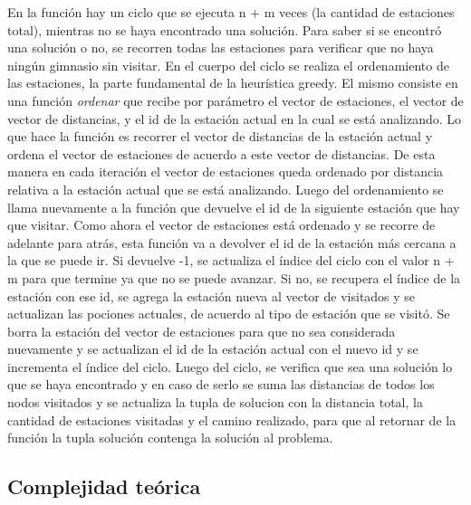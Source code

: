             En la función hay un ciclo que se ejecuta n + m veces (la cantidad de estaciones total), mientras no se haya encontrado una solución. Para saber si se encontró una solución o no, se recorren todas las estaciones para verificar que no haya ningún gimnasio sin visitar. En el cuerpo del ciclo se realiza el ordenamiento de las estaciones, la parte fundamental de la heurística greedy. El mismo consiste en una función \textit{ordenar} que recibe por parámetro el vector de estaciones, el vector de vector de distancias, y el id de la estación actual en la cual se está analizando. Lo que hace la función es recorrer el vector de distancias de la estación actual y ordena el vector de estaciones de acuerdo a este vector de distancias. De esta manera en cada iteración el vector de estaciones queda ordenado por distancia relativa a la estación actual que se está analizando. Luego del ordenamiento se llama nuevamente a la función que devuelve el id de la siguiente estación que hay que visitar. Como ahora el vector de estaciones está ordenado y se recorre de adelante para atrás, esta función va a devolver el id de la estación más cercana a la que se puede ir. Si devuelve -1, se actualiza el índice del ciclo con el valor n + m para que termine ya que no se puede avanzar. Si no, se recupera el índice de la estación con ese id, se agrega la estación nueva al vector de visitados y se actualizan las pociones actuales, de acuerdo al tipo de estación que se visitó. Se borra la estación del vector de estaciones para que no sea considerada nuevamente y se actualizan el id de la estación actual con el nuevo id y se incrementa el índice del ciclo. Luego del ciclo, se verifica que sea una solución lo que se haya encontrado y en caso de serlo se suma las distancias de todos los nodos visitados y se actualiza la tupla de solucion con la distancia total, la cantidad de estaciones visitadas y el camino realizado, para que al retornar de la función la tupla solución contenga la solución al problema. 

    \subsection{Complejidad teórica}

